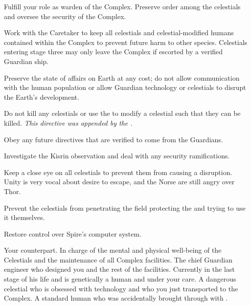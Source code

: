 \documentclass[char]{guardians}
\begin{document}
\begin{itemz}
  \item Fulfill your role as warden of the Complex. Preserve order among the celestials and oversee the security of the Complex.
  \item Work with the Caretaker to keep all celestials and celestial-modified humans contained within the Complex to prevent future harm to other species. Celestials entering stage three may only leave the Complex if escorted by a verified Guardian ship.
  \item Preserve the state of affairs on Earth at any cost; do not allow communication with the human population or allow Guardian technology or celestials to disrupt the Earth's development.
	\item Do not kill any celestials or use the \assembler{} to modify a celestial such that they can be killed. \emph{This directive was appended by the \cCaretaker{}.}
  \item Obey any future directives that are verified to come from the Guardians.
\end{itemz}

\begin{itemz}
  \item Investigate the Kisrin observation and deal with any security ramifications.
  \item Keep a close eye on all celestials to prevent them from causing a disruption. Unity is very vocal about \cUnity{\their} desire to escape, and the Norse are still angry over Thor.
  \item Prevent the celestials from penetrating the field protecting the \stone{} and trying to use it themselves.
  \item Restore control over Spire's computer system.
\end{itemz}


\begin{contacts}
  \contact{\cCaretaker{}} Your counterpart. In charge of the mental and physical well-being of the Celestials and the maintenance of all Complex facilities.
  \contact{\cJascha{}} The chief Guardian engineer who designed you and the rest of the facilities. Currently in the last stage of his life and is genetically a human and under your care.
  \contact{\cUnity{}} A dangerous celestial who is obsessed with technology and who you just transported to the Complex.
  \contact{\cKachiko{}} A standard human who was accidentally brought through with \cUnity{}.
\end{contacts}
\end{document}
